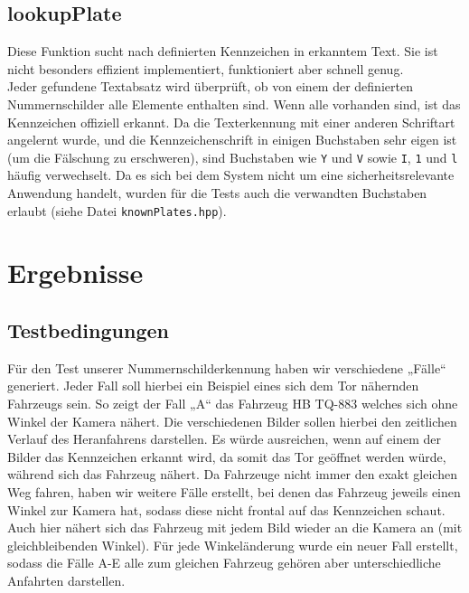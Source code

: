 \documentclass{../Vorlage/sebDenCls}
\begin{document}


\subsection{lookupPlate}
\label{lookupPlate}
Diese Funktion sucht nach definierten Kennzeichen in erkanntem Text. Sie ist nicht besonders effizient implementiert, funktioniert aber schnell genug.\\
Jeder gefundene Textabsatz wird überprüft, ob von einem der definierten Nummernschilder alle Elemente enthalten sind. Wenn alle vorhanden sind, ist das Kennzeichen offiziell erkannt. Da die Texterkennung mit einer anderen Schriftart angelernt wurde, und die Kennzeichenschrift in einigen Buchstaben sehr eigen ist (um die Fälschung zu erschweren), sind Buchstaben wie \texttt{Y} und \texttt{V} sowie \texttt{I}, \texttt{1} und \texttt{l} häufig verwechselt. Da es sich bei dem System nicht um eine sicherheitsrelevante Anwendung handelt, wurden für die Tests auch die verwandten Buchstaben erlaubt (siehe Datei \texttt{knownPlates.hpp}).


\section{Ergebnisse}
\subsection{Testbedingungen}
Für den Test unserer Nummernschilderkennung haben wir verschiedene „Fälle“ generiert. Jeder Fall soll hierbei ein Beispiel eines sich dem Tor nähernden Fahrzeugs sein. So zeigt der Fall „A“ das Fahrzeug HB TQ-883 welches sich ohne Winkel der Kamera nähert. Die verschiedenen Bilder sollen hierbei den zeitlichen Verlauf des Heranfahrens darstellen. Es würde ausreichen, wenn auf einem der Bilder das Kennzeichen erkannt wird, da somit das Tor geöffnet werden würde, während sich das Fahrzeug nähert. Da Fahrzeuge nicht immer den exakt gleichen Weg fahren, haben wir weitere Fälle erstellt, bei denen das Fahrzeug jeweils einen Winkel zur Kamera hat, sodass diese nicht frontal auf das Kennzeichen schaut. Auch hier nähert sich das Fahrzeug mit jedem Bild wieder an die Kamera an (mit gleichbleibenden Winkel). Für jede Winkeländerung wurde ein neuer Fall erstellt,
sodass die Fälle A-E alle zum gleichen Fahrzeug gehören aber unterschiedliche Anfahrten darstellen.
\end{document}

